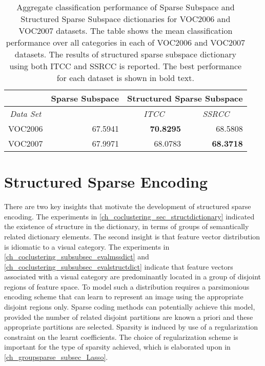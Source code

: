 \begin{table}[htbp]
\centering
\renewcommand{\arraystretch}{1.5}
\begin{tabular}{|l|r|c|r|}
\hline
 & \multicolumn{1}{c|}{Sparse Subspace} & \multicolumn{ 2}{c|}{Structured Sparse Subspace} \\ \hline
\multicolumn{1}{|c|}{\textit{Data Set}} & \multicolumn{1}{l|}{} & \textit{ITCC} & \multicolumn{1}{c|}{\textit{SSRCC}} \\ \hline
VOC2006 & 67.5941 & \multicolumn{1}{r|}{\textbf{70.8295}} & 68.5808 \\ \hline
VOC2007 & 67.9971 & \multicolumn{1}{r|}{68.0783} & \textbf{68.3718} \\ \hline
\end{tabular}
\caption[Aggregate classification performance of Sparse Subspace and Structured Sparse Subspace dictionaries for VOC2006 and VOC2007 datasets.]{Aggregate classification performance of Sparse Subspace and Structured Sparse Subspace dictionaries for VOC2006 and VOC2007 datasets. The table shows the mean classification performance over all categories in each of VOC2006 and VOC2007 datasets. The results of structured sparse subspace dictionary using both ITCC and SSRCC is reported. The best performance for each dataset is shown in bold text.}
\label{tab:sspcaDataset}
\end{table}


\section[Structured Sparse Encoding]{Structured Sparse Encoding}
\label{ch_groupsparse_sec_encoding}

There are two key insights that motivate the development of structured sparse encoding. The experiments in \cref{ch_coclustering_sec_structdictionary} indicated the existence of structure in the dictionary, in terms of groups of semantically related dictionary elements. The second insight is that feature vector distribution is idiomatic to a visual category. The experiments in \cref{ch_coclustering_subsubsec_evalmssdict} and \cref{ch_coclustering_subsubsec_evalstructdict} indicate that feature vectors associated with a visual category are predominantly located in a group of disjoint regions of feature space. To model such a distribution requires a parsimonious encoding scheme that can learn to represent an image using the appropriate disjoint regions only. Sparse coding methods can potentially achieve this model, provided the number of related disjoint partitions are known a priori and these appropriate partitions are selected. Sparsity is induced by use of a regularization constraint on the learnt 
coefficients. The choice of regularization scheme is important for the type of sparsity achieved, which is elaborated upon in \cref{ch_groupsparse_subsec_Lasso}. 

